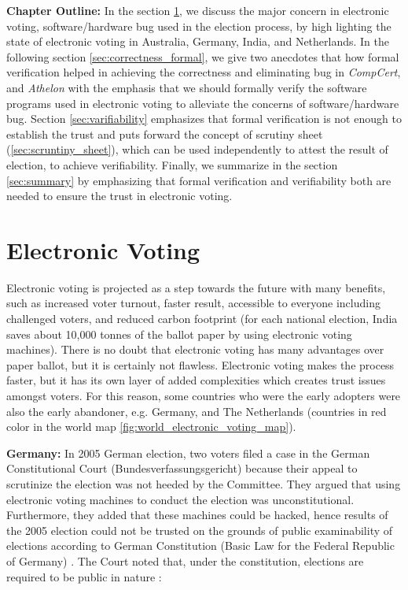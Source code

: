  
\textbf{Chapter Outline:}
 In the section \ref{sec:electronic_voting}, we discuss 
 the major concern in electronic voting, software/hardware 
 bug used in the election process, by high lighting the 
 state of electronic voting in Australia, Germany, India, 
 and Netherlands. In the following section \ref{sec:correctness_formal}, we  give 
 two anecdotes that how formal verification helped in achieving 
 the correctness and eliminating bug in \textit{CompCert}, 
 and \textit{Athelon} with 
 the emphasis that we should formally verify the software programs
 used in electronic voting to alleviate the concerns of 
 software/hardware bug. Section \ref{sec:varifiability} 
 emphasizes that formal verification is not enough
 to establish the trust and puts forward the concept of 
 scrutiny sheet (\ref{sec:scruntiny_sheet}), which 
 can be used independently to attest the result of election, 
 to achieve verifiability. Finally, we summarize in the section \ref{sec:summary}
 by emphasizing that formal verification and verifiability both are needed 
 to ensure the trust in electronic voting. 
 
  

\section{Electronic Voting}
 \label{sec:electronic_voting}
  Electronic voting is projected as a step towards the future with 
  many benefits, such as increased voter turnout, faster result, 
  accessible to everyone including challenged voters, and reduced 
  carbon footprint (for each 
  national election, India saves about 10,000 tonnes of the ballot 
  paper by using electronic voting machines). 
  There is no doubt that electronic voting has many advantages 
  over paper ballot, but it is certainly not flawless.  
  Electronic voting makes 
  the process faster, but it has its own layer of added complexities 
  which creates trust issues amongst voters. For this reason, some countries 
  who were the early adopters were also the early abandoner, e.g.
  Germany, and The Netherlands (countries in red color in the world map 
  \ref{fig:world_electronic_voting_map}).
  
  
  \textbf{Germany:} In 2005 German election, two voters filed a case in the German 
  Constitutional Court (Bundesverfassungsgericht) because their 
  appeal to scrutinize the election 
  was not heeded by the Committee. They argued that using electronic 
  voting machines to conduct the election was unconstitutional. Furthermore,
  they added that
  these machines could be hacked, hence results of the 2005 election 
  could not be trusted on the grounds 
  of public examinability of elections according to German Constitution 
  (Basic Law for the Federal Republic of Germany) \citep{Germanconst}. 
  The Court noted that, under the constitution, elections are 
  required to be public in nature \citep{Germanconst}:
  
